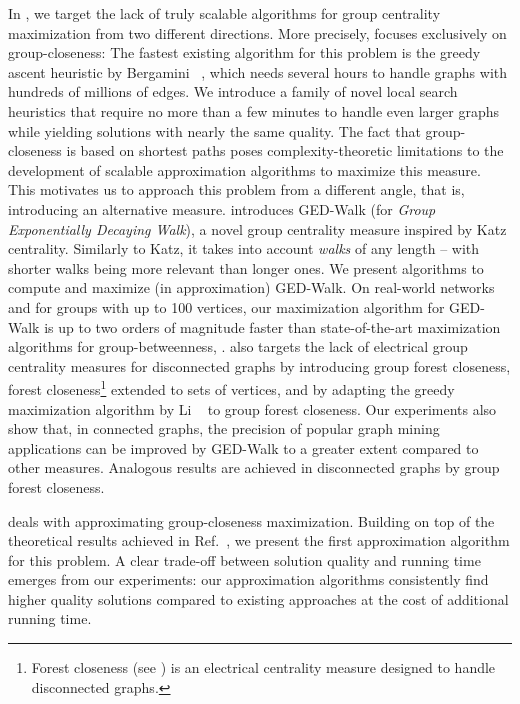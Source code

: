In , we target the lack of truly
scalable algorithms for group centrality maximization from two different
directions.
More precisely,  focuses exclusively on
group-closeness: The fastest existing algorithm for this problem is the greedy
ascent heuristic by Bergamini \etal~\cite{DBLP:conf/alenex/BergaminiGM18}, which needs
several hours to handle graphs with hundreds of millions of edges.
We introduce a family of novel local search heuristics that require no more
than a few minutes to handle even larger graphs while yielding solutions with
nearly the same quality.
The fact that group-closeness is based on shortest paths poses
complexity-theoretic limitations to the development of scalable approximation
algorithms to maximize this measure. This motivates us to approach this problem
from a different angle, that is, introducing an alternative measure.
 introduces GED-Walk (for \emph{Group Exponentially Decaying
Walk}), a novel group centrality measure inspired by Katz centrality. Similarly
to Katz, it takes into account \emph{walks} of any length -- with shorter walks
being more relevant than longer ones.
We present algorithms to compute and maximize (in approximation) GED-Walk.
On real-world networks and for groups with up to 100 vertices, our maximization
algorithm for GED-Walk is up to two orders of magnitude faster than state-of-the-art
 maximization algorithms for group-betweenness,
.
%
 also targets the lack of electrical
group centrality measures for disconnected graphs by introducing
group forest closeness, \ie forest
closeness\footnote{Forest closeness (see )
is an electrical centrality measure designed to handle disconnected graphs.}
extended to sets of vertices, and by adapting the greedy maximization algorithm
by Li \etal~\cite{DBLP:conf/www/0002PSYZ19} to group forest closeness.
Our experiments also show that, in connected graphs, the precision of
popular graph mining applications can be improved by GED-Walk to a greater
extent compared to other measures.
Analogous results are achieved in disconnected graphs by group forest closeness.

 deals with approximating
group-closeness maximization. Building on top of the theoretical results
achieved in Ref.~\cite{DBLP:conf/alenex/AngrimanBDGGM21}, we present
the first approximation algorithm for this problem.
A clear trade-off between solution quality and running time emerges from our
experiments: our approximation algorithms consistently find higher quality
solutions compared to existing approaches at the cost of additional running
time.

